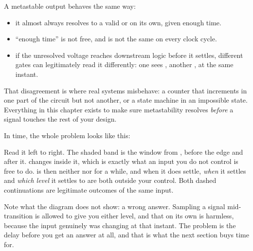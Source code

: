 A metastable output behaves the same way:
\begin{itemize}
  \item it almost always resolves to a valid  or  on its own, given enough time.
  \item ``enough time'' is not free, and is not the same on every clock cycle.
  \item if the unresolved voltage reaches downstream logic before it settles, different gates can
    legitimately read it differently: one sees , another , at the same instant.
\end{itemize}
That disagreement is where real systems misbehave: a counter that increments in one part of the
circuit but not another, or a state machine in an impossible state. Everything in this chapter
exists to make sure metastability resolves \emph{before} a signal touches the rest of your design.

In time, the whole problem looks like this:


\noindent Read it left to right. The shaded band is the window from , 
before the edge and  after it.  changes inside it, which is exactly what an input
you do not control is free to do.  is then neither  nor  for a while, and
when it does settle, \emph{when} it settles and \emph{which level} it settles to are both outside
your control. Both dashed continuations are legitimate outcomes of the same input.

Note what the diagram does not show: a wrong answer. Sampling a signal mid-transition is allowed to
give you either level, and that on its own is harmless, because the input genuinely was changing at
that instant. The problem is the delay before you get an answer at all, and that is what the next
section buys time for.

